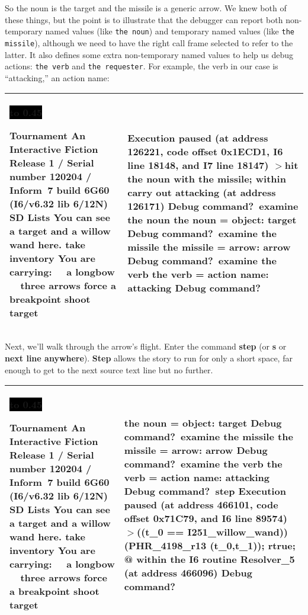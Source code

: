 \documentclass{book}
\newcommand{\n}{\hspace*{\fill}\newline}
\newcommand{\terp}[2]{\begin{center}\begin{tabular}{p{0.45\textwidth}|p{0.45\textwidth}}\midrule #1&#2\\\midrule\end{tabular}\end{center}}
\newcommand{\glkheading}[1]{\textbf{#1}}
\newcommand{\glkinput}[1]{\textbf{#1}}
\newcommand{\glkstatusline}[2]{\centerline{\colorbox{black}{\hbox to 0.45\textwidth{\textcolor{white}{#1\hfil #2}}}}}
\newcommand{\storyprompt}{\raisebox{1.5pt}{\(>\)}}
\newcommand{\cursor}{\raisebox{-1.5pt}{\RectangleThin}}
\newcommand{\markedindent}{\(>\)\qquad}
\begin{document}
So the noun is the target and the missile is a generic arrow.  We knew both of
these things, but the point is to illustrate that the debugger can report both
non-temporary named values (like \lstinline{the noun}) and temporary named
values (like \lstinline{the missile}), although we need to have the right call
frame selected to refer to the latter.  It also defines some extra non-temporary
named values to help us debug actions: \lstinline{the verb} and
\lstinline{the requester}.  For example, the verb in our case is ``attacking,''
an action name:

\terp{\glkstatusline{Lists}{0/2}\n
  \glkheading{Tournament}\n
  An Interactive Fiction\n
  Release 1 / Serial number 120204 / Inform~7 build 6G60 (I6/v6.32 lib 6/12N) SD\n
  \n
  \glkheading{Lists}\n
  You can see a target and a willow wand here.\n
  \n
  \storyprompt\glkinput{take inventory}\n
  You are carrying:\n
  \null\ \ a longbow\n
  \null\ \ three arrows\n
  \n
  \storyprompt\glkinput{force a breakpoint}\n
  \storyprompt\glkinput{shoot target}}{%
  Execution paused (at address 126221, code offset 0x1ECD1, I6 line 18148, and I7 line 18147)\n
  \markedindent hit the noun with the missile;\n
  within carry out attacking (at address 126171)\n
  \n
  Debug command?\ \glkinput{examine the noun}\n
  \n
  the noun = object: target\n
  \n
  Debug command?\ \glkinput{examine the missile}\n
  \n
  the missile = arrow: arrow\n
  \n
  Debug command?\ \glkinput{examine the verb}\n
  \n
  the verb = action name: attacking\n
  \n
  Debug command?\ \cursor}

Next, we'll walk through the arrow's flight.  Enter the command \glkinput{step}
(or \glkinput{s} or \glkinput{next line anywhere}).  \glkinput{Step} allows the
story to run for only a short space, far enough to get to the next source text
line but no further.

\terp{\glkstatusline{Lists}{0/2}\n
  \glkheading{Tournament}\n
  An Interactive Fiction\n
  Release 1 / Serial number 120204 / Inform~7 build 6G60 (I6/v6.32 lib 6/12N) SD\n
  \n
  \glkheading{Lists}\n
  You can see a target and a willow wand here.\n
  \n
  \storyprompt\glkinput{take inventory}\n
  You are carrying:\n
  \null\ \ a longbow\n
  \null\ \ three arrows\n
  \n
  \storyprompt\glkinput{force a breakpoint}\n
  \storyprompt\glkinput{shoot target}}{%
  the noun = object: target\n
  \n
  Debug command?\ \glkinput{examine the missile}\n
  \n
  the missile = arrow: arrow\n
  \n
  Debug command?\ \glkinput{examine the verb}\n
  \n
  the verb = action name: attacking\n
  \n
  Debug command?\ \glkinput{step}\n
  \n
  Execution paused (at address 466101, code offset 0x71C79, and I6 line 89574)\n
  \markedindent \lstinline@if ((t\_0 == I251\_willow\_wand)) { (PHR\_4198\_r13 (t\_0,t\_1)); rtrue; }@\n
  within the I6 routine Resolver\_5 (at address 466096)\n
  \n
  Debug command?\ \cursor}
\end{document}
